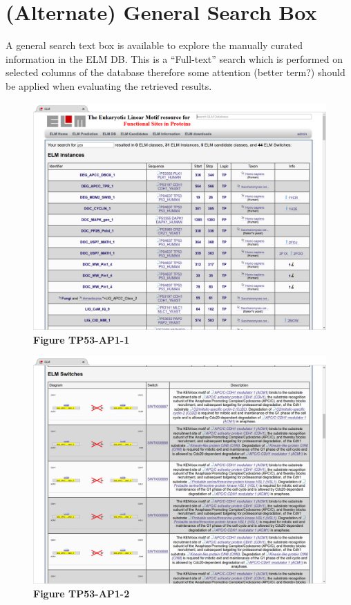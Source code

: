 \section{(Alternate) General Search Box}
\label{sec:general_search}

A general search text box is available to explore the manually curated
information in the ELM DB. This is a ``Full-text'' search which is
performed on selected columns of the database therefore some attention
(better term?) should be applied when evaluating the retrieved results.

\begin{enumerate}

\begin{figure}[h!]
	\centering
	\includegraphics[width=\textwidth]{Figures/general_search/TP53_instances.png} 
	\caption{
	\textbf{Figure TP53-AP1-1}
	}
	\label{fig:general_search_TP53_instances}
\end{figure}

\begin{figure}[h!]
	\centering
	\includegraphics[width=\textwidth]{Figures/general_search/TP53_switches.png} 
	\caption{
	\textbf{Figure TP53-AP1-2}
	}
	\label{fig:general_search_TP53_switches}
\end{figure}


\end{enumerate}
